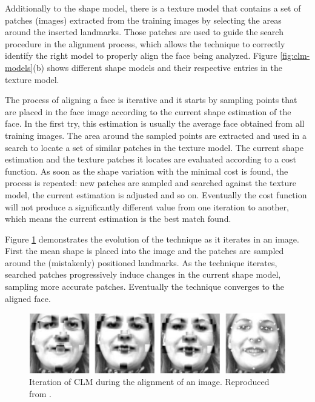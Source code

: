 Additionally to the shape model, there is a texture model that contains a set of patches (images) extracted from the training images by selecting the areas around the inserted landmarks. Those patches are used to guide the search procedure in the alignment process, which allows the technique to correctly identify the right model to properly align the face being analyzed. Figure \ref{fig:clm-models}(b) shows different shape models and their respective entries in the texture model.

The process of aligning a face is iterative and it starts by sampling points that are placed in the face image according to the current shape estimation of the face. In the first try, this estimation is usually the average face obtained from all training images. The area around the sampled points are extracted and used in a search to locate a set of similar patches in the texture model. The current shape estimation and the texture patches it locates are evaluated according to a cost function. As soon as the shape variation with the minimal cost is found, the process is repeated: new patches are sampled and searched against the texture model, the current estimation is adjusted and so on. Eventually the cost function will not produce a significantly different value from one iteration to another, which means the current estimation is the best match found.

Figure \ref{fig:clm-evolution} demonstrates the evolution of the technique as it iterates in an image. First the mean shape is placed into the image and the patches are sampled around the (mistakenly) positioned landmarks. As the technique iterates, searched patches progressively induce changes in the current shape model, sampling more accurate patches. Eventually the technique converges to the aligned face.

\begin{figure}[h]
    \centering
    \includegraphics[width=\linewidth]{Content/figures/clm-evolution.jpg}
    \caption{Iteration of CLM during the alignment of an image. Reproduced from \textcite{cristinacce2006feature}.}
    \label{fig:clm-evolution}
\end{figure}

